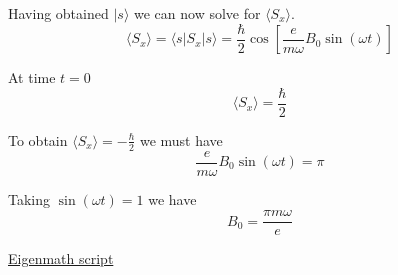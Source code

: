 Having obtained $|s\rangle$ we can now solve for $\langle S_x\rangle$.
\begin{equation*}
\langle S_x\rangle=\langle s|S_x|s\rangle
=\frac{\hbar}{2}\cos\left[\frac{e}{m\omega}B_0\sin(\omega t)\right]
\tag{2}
\end{equation*}

At time $t=0$
\begin{equation*}
\langle S_x\rangle=\frac{\hbar}{2}
\end{equation*}

To obtain $\langle S_x\rangle=-\frac{\hbar}{2}$ we must have
\begin{equation*}
\frac{e}{m\omega}B_0\sin(\omega t)=\pi
\end{equation*}

Taking $\sin(\omega t)=1$ we have
\begin{equation*}
B_0=\frac{\pi m\omega}{e}
\end{equation*}

\href{https://georgeweigt.github.io/examples/spin-flip-demo.html}{Eigenmath script}


